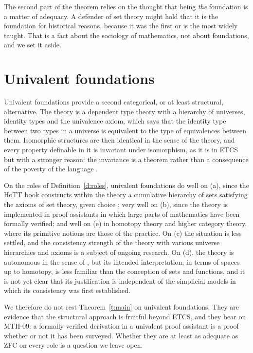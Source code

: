 \documentclass{situationist-preprint}
\begin{document}
The second part of the theorem relies on the thought that being \emph{the} foundation is a matter of adequacy. A defender of set theory might hold that it is the foundation for historical reasons, because it was the first or is the most widely taught. That is a fact about the sociology of mathematics, not about foundations, and we set it aside.

\section{Univalent foundations}\label{s:univalent}

Univalent foundations provide a second categorical, or at least structural, alternative. The theory is a dependent type theory with a hierarchy of universes, identity types and the univalence axiom, which says that the identity type between two types in a universe is equivalent to the type of equivalences between them. Isomorphic structures are then identical in the sense of the theory, and every property definable in it is invariant under isomorphism, as it is in ETCS but with a stronger reason: the invariance is a theorem rather than a consequence of the poverty of the language \citep{Awodey2014}.

On the roles of Definition~\ref{d:roles}, univalent foundations do well on (a), since the HoTT book constructs within the theory a cumulative hierarchy of sets satisfying the axioms of set theory, given choice \citep{UFP2013}; very well on (b), since the theory is implemented in proof assistants in which large parts of mathematics have been formally verified; and well on (e) in homotopy theory and higher category theory, where its primitive notions are those of the practice. On (c) the situation is less settled, and the consistency strength of the theory with various universe hierarchies and axioms is a subject of ongoing research. On (d), the theory is autonomous in the sense of \citet{LinneboPettigrew2011}, but its intended interpretation, in terms of spaces up to homotopy, is less familiar than the conception of sets and functions, and it is not yet clear that its justification is independent of the simplicial models in which its consistency was first established.

We therefore do not rest Theorem~\ref{t:main} on univalent foundations. They are evidence that the structural approach is fruitful beyond ETCS, and they bear on MTH-09: a formally verified derivation in a univalent proof assistant is a proof whether or not it has been surveyed. Whether they are at least as adequate as ZFC on every role is a question we leave open.
\end{document}
